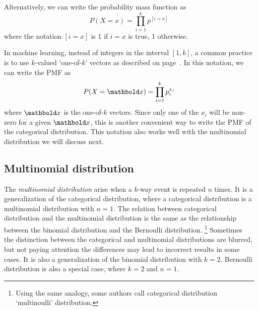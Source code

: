 Alternatively,
we can write the probability mass function as
\[P(X=x) = \prod_{i=1}^{k} p^{[i=x]}\]
where the notation $[i=x]$ is \num{1} if $i = x$ is true,
\num{1} otherwise.
\begin{marginfigure}
  \caption{\label{fig:pmf-categorical}%
    An example categorical PMF:
    probabilities of obtaining values 1 through 12
    in a roll of two fair dice as either on the face of a single die,
    or as the sum of both.
    This distribution has to be (implicitly) internalized
    by any good backgammon player.
   }
\end{marginfigure}

In machine learning,
instead of integers in the interval $[1,k]$,
a common practice is to use $k$-valued `one-of-$k$' vectors
as described on page~\pageref{desc:one-hot}.
In this notation, we can write the PMF as
\[P(X=\vect{x}) = \prod_{i=1}^{k} p_{i}^{x_{i}}\]
where $\vect{x}$ is the one-of-$k$ vectors.
Since only one of the $x_{i}$ will be non-zero for a given $\vect{x}$,
this is another convenient way to write the PMF
of the categorical distribution.
This notation also works well
with the multinomial distribution we will discuss next.


\subsection{Multinomial distribution}

The \emph{multinomial distribution} arise
when a $k$-way event is repeated $n$ times.
It is a generalization of the categorical distribution,
where a categorical distribution is
a multinomial distribution with $n = 1$.
The relation between categorical distribution and
the multinomial distribution is the same as the relationship between
the binomial distribution and the Bernoulli distribution.%
\footnote{%
  Using the same analogy, 
  some authors call categorical distribution `multinoulli' distribution.
}
Sometimes the distinction between the categorical and multinomial distributions are blurred,
but not paying attention the differences may lead to incorrect results in some cases.
It is also a generalization of the binomial distribution with $k=2$.
Bernoulli distribution is also a special case,
where $k = 2$ and $n = 1$.

